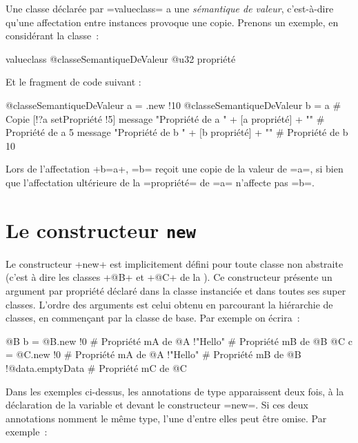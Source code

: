
Une classe déclarée par \ggsq=valueclass= a une \emph{sémantique de valeur}, c'est-à-dire qu'une affectation entre instances provoque une copie. Prenons un exemple, en considérant la classe~:

\begin{galgas4}
valueclass @classeSemantiqueDeValeur {
  @u32 propriété
}
\end{galgas4}

Et le fragment de code suivant :

\begin{galgas4}
@classeSemantiqueDeValeur a = .new {!10}
@classeSemantiqueDeValeur b = a # Copie
[!?a setPropriété !5]
message "Propriété de a " + [a propriété] + "\n" # Propriété de a 5
message "Propriété de b " + [b propriété] + "\n" # Propriété de b 10
\end{galgas4}

Lors de l'affectation \ggsq+b=a+, \ggsq=b= reçoit une copie de la valeur de \ggsq=a=, si bien que l'affectation ultérieure de la \ggsq=propriété= de \ggsq=a= n'affecte pas \ggsq=b=.








\section{Le constructeur \texttt{new}}

Le constructeur \ggsq+new+ est implicitement défini pour toute classe non abstraite (c'est à dire les classes \ggsq+@B+ et \ggsq+@C+ de la ). Ce constructeur présente un argument par propriété déclaré dans la classe instanciée et dans toutes ses super classes. L'ordre des arguments est celui obtenu en parcourant la hiérarchie de classes, en commençant par la classe de base. Par exemple on écrira~:

\begin{galgas4}
@B b = @B.new {
  !0 # Propriété mA de @A
  !"Hello" # Propriété mB de @B
}
@C c = @C.new {
  !0 # Propriété mA de @A
  !"Hello" # Propriété mB de @B
  !@data.emptyData # Propriété mC de @C
}
\end{galgas4}

Dans les exemples ci-dessus, les annotations de type apparaissent deux fois, à la déclaration de la variable et devant le constructeur \ggsq=new=. Si ces deux annotations nomment le même type, l'une d'entre elles peut être omise. Par exemple~:

